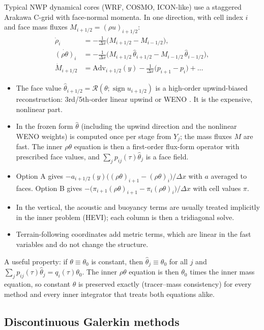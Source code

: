 \documentclass[11pt,a4paper]{article}
\theoremstyle{definition}
\theoremstyle{remark}
\begin{document}
Typical NWP dynamical cores (WRF, COSMO, ICON-like) use a staggered
Arakawa C-grid with face-normal momenta. In one direction, with cell
index $i$ and face mass fluxes $M_{i+1/2}=(\rho u)_{i+1/2}$:
\begin{align*}
 \dot\rho_i&=-\tfrac1{\Delta x}\big(M_{i+1/2}-M_{i-1/2}\big),\\
 \dot{(\rho\theta)}_i&=-\tfrac1{\Delta x}\big(M_{i+1/2}\,\hat\theta_{i+1/2}-M_{i-1/2}\,\hat\theta_{i-1/2}\big),\\
 \dot M_{i+1/2}&=\mathrm{Adv}_{i+1/2}(y)-\tfrac1{\Delta x}\big(p_{i+1}-p_i\big)+\dots
\end{align*}
\begin{itemize}
\item The face value $\hat\theta_{i+1/2}=\mathcal R(\theta;\operatorname{sign}u_{i+1/2})$
  is a high-order upwind-biased reconstruction: 3rd/5th-order linear
  upwind \cite{WickerSkamarock2002} or WENO \cite{JiangShu1996}. It is
  the expensive, nonlinear part.
\item In the frozen form $\hat\theta$ (including the upwind direction and
  the nonlinear WENO weights) is computed once per stage from $Y_j$; the
  mass fluxes $M$ are fast. The inner $\rho\theta$ equation is then a
  first-order flux-form operator with prescribed face values, and
  $\sum_jp_{ij}(\tau)\hat\theta_j$ is a face field.
\item Option A gives
  $-a_{i+1/2}(y)\big((\rho\theta)_{i+1}-(\rho\theta)_i\big)/\Delta x$
  with $a$ averaged to faces. Option B gives
  $-\big(\pi_{i+1}(\rho\theta)_{i+1}-\pi_i(\rho\theta)_i\big)/\Delta x$
  with cell values $\pi$.
\item In the vertical, the acoustic and buoyancy terms are usually
  treated implicitly in the inner problem (HEVI); each column is then a
  tridiagonal solve.
\item Terrain-following coordinates add metric terms, which are linear in
  the fast variables and do not change the structure.
\end{itemize}

A useful property: if $\theta\equiv\theta_0$ is constant, then
$\hat\theta_j\equiv\theta_0$ for all $j$ and
$\sum_jp_{ij}(\tau)\hat\theta_j=q_i(\tau)\theta_0$. The inner $\rho\theta$
equation is then $\theta_0$ times the inner mass equation, so constant
$\theta$ is preserved exactly (tracer--mass consistency) for every
method and every inner integrator that treats both equations alike.

\subsection{Discontinuous Galerkin methods}
\end{document}
